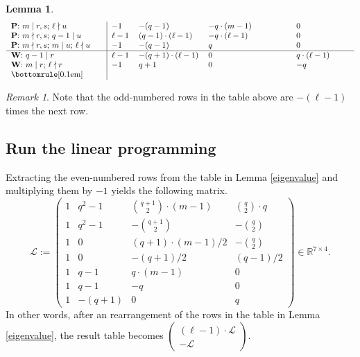 \documentclass[12pt, reqno]{amsart}
\theoremstyle{definition}
\newtheorem{lemma}[theorem]{Lemma}
\theoremstyle{remark}
\newtheorem{remark}[theorem]{Remark}
\numberwithin{equation}{section}
\newcommand{\BR}{\mathbb{R}}
\newcommand{\pt}[1]{\left(#1\right)}
\begin{document}
\begin{lemma}
\[\begin{tabular}{p{3.95cm}|p{0.75cm}p{2.6cm}p{3.4cm}p{2.3cm}}
		\textbf{P}: $m \mid r, s$; $\ell \nmid u$	&$-1$	&$-(q - 1)$	&$-q\cdot(m - 1)$	&$0$\\
		
		\textbf{P}: $m \nmid r, s$; $q - 1 \mid u$	&$\ell - 1$	&$(q - 1)\cdot(\ell - 1)$	&$-q\cdot(\ell - 1)$	&$0$\\
		
		\textbf{P}: $m \nmid r, s$; $m \mid u$; $\ell \nmid u$	&$-1$	&$-(q - 1)$	&$q$	&$0$\\
		
		\hline
		
		\textbf{W}: $q - 1 \mid r$	&$\ell - 1$	&$-(q + 1)\cdot(\ell - 1)$	&$0$	&$q\cdot(\ell - 1)$\\
		
		\textbf{W}: $m \mid r$; $\ell \nmid r$	&$-1$	&$q + 1$	&$0$	&$-q$\\
		
		\bottomrule[0.1em]
	\end{tabular}\]
	
\end{lemma}

\begin{remark}
	
	Note that the odd-numbered rows in the table above are $-(\ell - 1)$ times the next row.	
	
\end{remark}

\subsection{Run the linear programming}
Extracting the even-numbered rows from the table in Lemma \ref{eigenvalue} and multiplying them by $-1$ yields the following matrix. 
\[\mathcal{L} := \begin{pmatrix}
	1	&q^2 - 1	&\binom{q + 1}{2}\cdot(m - 1)	&\binom{q}{2}\cdot q\\
	
	1	&q^2 - 1	&-\binom{q + 1}{2}	&-\binom{q}{2}\\
	
	1	&0	&\pt{q + 1}\cdot(m - 1)/2	&-\binom{q}{2}\\
	
	1	&0	&-\pt{q + 1}/{2}	&\pt{q - 1}/{2}\\
	
	1	&q - 1	&q\cdot(m - 1)	&0\\
	
	1	&q - 1	&-q	&0\\
	
	1	&-(q + 1)	&0	&q
\end{pmatrix} \in \BR^{7 \times 4}.\]
In other words, after an rearrangement of the rows in the table in Lemma \ref{eigenvalue}, the result table becomes $\begin{pmatrix}
	(\ell - 1)\cdot\mathcal{L}\\-\mathcal{L}
\end{pmatrix}$.
\end{document}
